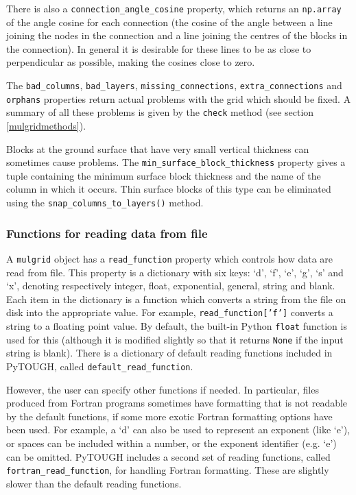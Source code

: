 There is also a \texttt{connection\_angle\_cosine} property, which returns an \texttt{np.array} of the angle cosine for each connection (the cosine of the angle between a line joining the nodes in the connection and a line joining the centres of the blocks in the connection).  In general it is desirable for these lines to be as close to perpendicular as possible, making the cosines close to zero.

The \texttt{bad\_columns}, \texttt{bad\_layers}, \texttt{missing\_connections}, \texttt{extra\_connections} and \texttt{orphans} properties return actual problems with the grid which should be fixed.  A summary of all these problems is given by the \texttt{check} method (see section \ref{mulgridmethods}).

Blocks at the ground surface that have very small vertical thickness can sometimes cause problems.  The \texttt{min\_surface\_block\_thickness} property gives a tuple containing the minimum surface block thickness and the name of the column in which it occurs.  Thin surface blocks of this type can be eliminated using the \texttt{snap\_columns\_to\_layers()} method.

\subsubsection{Functions for reading data from file}
\label{mulgridreadfunctions}

A \texttt{mulgrid} object has a \texttt{read\_function} property which controls how data are read from file.  This property is a dictionary with six keys: `d', `f', `e', `g', `s' and `x', denoting respectively integer, float, exponential, general, string and blank.  Each item in the dictionary is a function which converts a string from the file on disk into the appropriate value.  For example, \texttt{read\_function['f']} converts a string to a floating point value.  By default, the built-in Python \texttt{float} function is used for this (although it is modified slightly so that it returns \texttt{None} if the input string is blank).  There is a dictionary of default reading functions included in PyTOUGH, called \texttt{default\_read\_function}.

However, the user can specify other functions if needed.  In particular, files produced from Fortran programs sometimes have formatting that is not readable by the default functions, if some more exotic Fortran formatting options have been used.   For example, a `d' can also be used to represent an exponent (like `e'), or spaces can be included within a number, or the exponent identifier (e.g. `e') can be omitted.  PyTOUGH includes a second set of reading functions, called \texttt{fortran\_read\_function}, for handling Fortran formatting.  These are slightly slower than the default reading functions.

